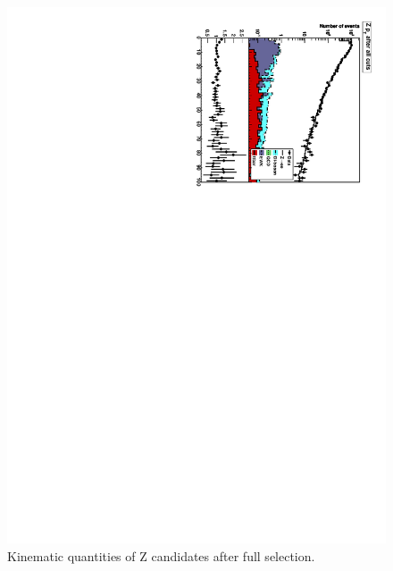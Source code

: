  \begin{figure}[htb]
  \begin{center}
    \includegraphics[width=360pt, angle=90]{Figures/Zquantities-04Apr11.pdf}
  \end{center}
  \caption[Kinematic quantities of Z candidates after full selection]{Kinematic quantities of Z candidates after full selection.}
  \label{fig:Zquantities}
 \end{figure}



\clearpage
